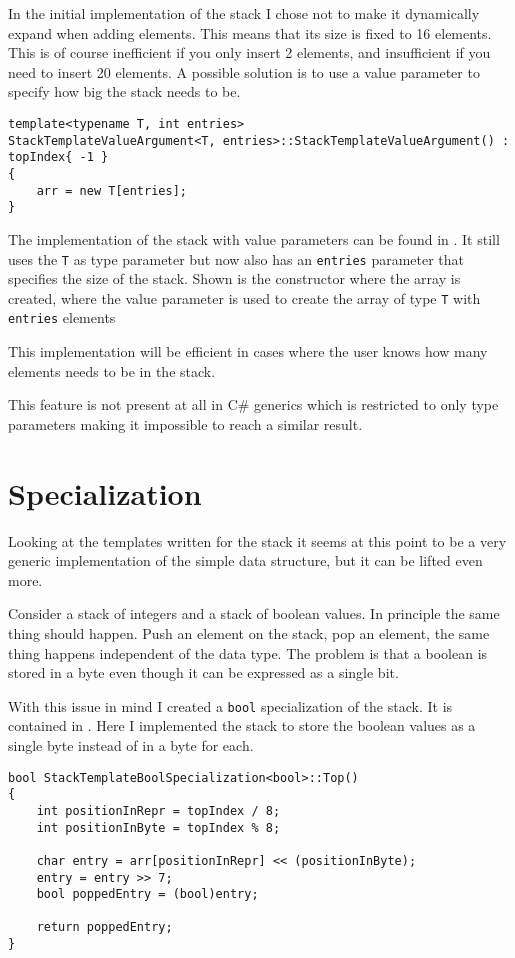 In the initial implementation of the stack I chose not to make it dynamically expand when adding elements.
This means that its size is fixed to 16 elements.
This is of course inefficient if you only insert 2 elements, and insufficient if you need to insert 20 elements.
A possible solution is to use a value parameter to specify how big the stack needs to be.

\begin{lstlisting}
template<typename T, int entries>
StackTemplateValueArgument<T, entries>::StackTemplateValueArgument() : topIndex{ -1 }
{
	arr = new T[entries];
}
\end{lstlisting}


The implementation of the stack with value parameters can be found in .
It still uses the \texttt{T} as type parameter but now also has an \texttt{entries} parameter that specifies the size of the stack.
Shown is the constructor where the array is created, where the value parameter is used to create the array of type \texttt{T} with \texttt{entries} elements

This implementation will be efficient in cases where the user knows how many elements needs to be in the stack.

This feature is not present at all in C\# generics which is restricted to only type parameters \cite{cgenerics} making it impossible to reach a similar result.

\section{Specialization}
Looking at the templates written for the stack it seems at this point to be a very generic implementation of the simple data structure, but it can be lifted even more.

Consider a stack of integers and a stack of boolean values.
In principle the same thing should happen.
Push an element on the stack, pop an element, the same thing happens independent of the data type.
The problem is that a boolean is stored in a byte even though it can be expressed as a single bit.

With this issue in mind I created a \texttt{bool} specialization of the stack.
It is contained in .
Here I implemented the stack to store the boolean values as a single byte instead of in a byte for each.

\begin{lstlisting}
bool StackTemplateBoolSpecialization<bool>::Top()
{
	int positionInRepr = topIndex / 8;
	int positionInByte = topIndex % 8;

	char entry = arr[positionInRepr] << (positionInByte);
	entry = entry >> 7;
	bool poppedEntry = (bool)entry;

	return poppedEntry;
}
\end{lstlisting}

